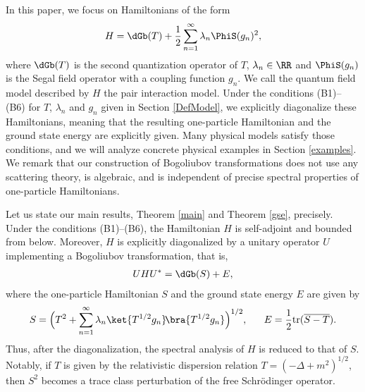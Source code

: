 \documentclass[12pt,draft]{article}
\theoremstyle{plain}
\numberwithin{equation}{section}
\theoremstyle{remark}
\begin{document}
In this paper, we focus on Hamiltonians of the form
\begin{align*}
  H = \dGb(T) + \frac{1}{2}\sum_{n=1}^\infty \lambda_n \PhiS(g_n)^2,
\end{align*}
where $\dGb(T)$ is the second quantization operator of $T$, 
$\lambda_n\in\RR$ and $\PhiS(g_n)$ is the Segal field operator with a coupling function $g_n$.
We call the quantum field model described by $H$ the pair interaction model.
Under the conditions (B1)--(B6) for $T$, $\lambda_n$ and $g_n$ given in Section \ref{DefModel},
we explicitly diagonalize these Hamiltonians, meaning that the resulting one-particle Hamiltonian
 and the ground state energy are explicitly given.
Many physical models satisfy those conditions, and 
we will analyze concrete physical examples in Section \ref{examples}.
We remark that our construction of Bogoliubov transformations does not use any scattering theory, is algebraic, 
and is independent of precise spectral properties of one-particle Hamiltonians.


Let us state our main results, Theorem \ref{main} and Theorem \ref{gse}, precisely.
Under the conditions (B1)--(B6), the Hamiltonian $H$ is self-adjoint and bounded from below.
Moreover, $H$ is explicitly diagonalized 
by a unitary operator $U$ implementing a Bogoliubov transformation, that is, 
\begin{align*}
  UHU^* = \dGb(S) + E,
\end{align*}
where the one-particle Hamiltonian $S$ and the ground state energy $E$ are given by
\[
S = \Big(T^2+\sum_{n=1}^\infty \lambda_n \ket{T^{1/2}g_n}\!\bra{T^{1/2}g_n}\Big)^{1/2},\ \ \ \ \ 
E = \frac{1}{2} \mathrm{tr}(\overline{S-T}).
\]
Thus, after the diagonalization, the spectral analysis of $H$ is reduced to 
that of $S$.
Notably, if $T$ is given by the relativistic dispersion relation $T=(-\Delta+m^2)^{1/2}$, 
then $S^2$ becomes a trace class perturbation of the free Schr\"odinger operator.
\end{document}
